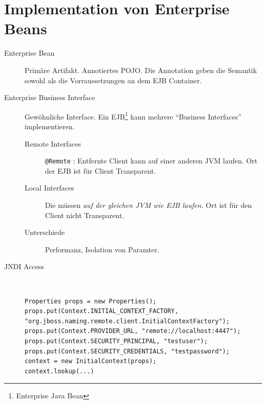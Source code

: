 \documentclass[a4paper,10pt]{scrreprt}
\begin{document}
\section{Implementation von Enterprise Beans}
\begin{description}
 \item [Enterprise Bean] Primäre Artifakt. Annotiertes POJO. Die Annotation geben die Semantik sowohl als die Vorraussetzungen an dem EJB Container.
 \item [Enterprise Business Interface] Gewöhnliche Interface. Ein EJB\footnote{Enterprise Java Bean} kann mehrere ``Business Interfaces'' implementieren.\\
 \begin{description}
  \item [Remote Interfaces] \texttt{@Remote} : Entfernte Client kann auf einer anderen JVM laufen. Ort der EJB ist für Client Transparent.
  \item [Local Interfaces] Die müssen \textit{auf der gleichen JVM wie EJB laufen.} Ort ist für den Client nicht Transparent.
  \item [Unterschiede] Performanz, Isolation von Paramter. 
 \end{description}
\item [JNDI Access] \hfill \\
\begin{lstlisting}[caption=JNDI]
 Properties props = new Properties();
props.put(Context.INITIAL_CONTEXT_FACTORY,
"org.jboss.naming.remote.client.InitialContextFactory");
props.put(Context.PROVIDER_URL, "remote://localhost:4447");
props.put(Context.SECURITY_PRINCIPAL, "testuser");
props.put(Context.SECURITY_CREDENTIALS, "testpassword");
context = new InitialContext(props);
context.lookup(...)
\end{lstlisting}

\end{description}
\end{document}
